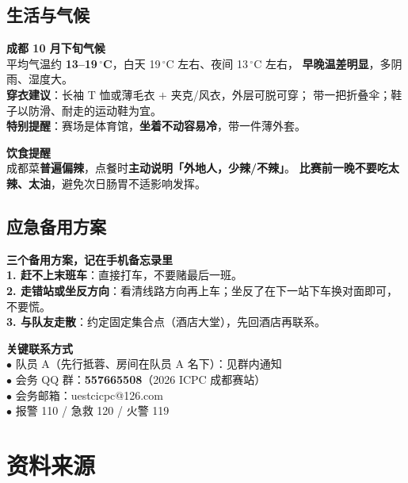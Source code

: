 \documentclass[11pt,a4paper,fontset=windows]{ctexart}
\begin{document}
\subsection{生活与气候}

\begin{keybox}
\textbf{成都 10 月下旬气候}\\
平均气温约 \textbf{13--19\,$^\circ$C}，白天 19\,$^\circ$C 左右、夜间 13\,$^\circ$C 左右，
\textbf{早晚温差明显}，多阴雨、湿度大。\\[0.4em]
\textbf{穿衣建议}：长袖 T 恤或薄毛衣 $+$ 夹克/风衣，外层可脱可穿；
带一把折叠伞；鞋子以防滑、耐走的运动鞋为宜。\\
\textbf{特别提醒}：赛场是体育馆，\textbf{坐着不动容易冷}，带一件薄外套。
\end{keybox}

\begin{warnbox}
\textbf{饮食提醒}\\
成都菜\textbf{普遍偏辣}，点餐时\textbf{主动说明「外地人，少辣/不辣」}。
\textbf{比赛前一晚不要吃太辣、太油}，避免次日肠胃不适影响发挥。
\end{warnbox}

\subsection{应急备用方案}

\begin{warnbox}
\textbf{三个备用方案，记在手机备忘录里}\\
\textbf{1. 赶不上末班车}：直接打车，不要赌最后一班。\\
\textbf{2. 走错站或坐反方向}：看清线路方向再上车；坐反了在下一站下车换对面即可，不要慌。\\
\textbf{3. 与队友走散}：约定固定集合点（酒店大堂），先回酒店再联系。
\end{warnbox}

\begin{keybox}
\textbf{关键联系方式}\\
$\bullet$ 队员 A（先行抵蓉、房间在队员 A 名下）：见群内通知\\
$\bullet$ 会务 QQ 群：\textbf{557665508}（2026 ICPC 成都赛站）\\
$\bullet$ 会务邮箱：uestcicpc@126.com\\
$\bullet$ 报警 110 / 急救 120 / 火警 119
\end{keybox}

\appendix
\section{资料来源}
\end{document}
